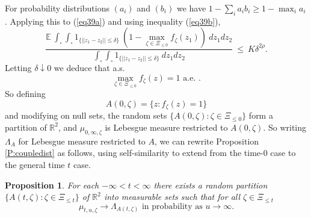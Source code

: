 \documentclass[12pt]{article}
\newtheorem{Proposition}[Lemma]{Proposition}
\newcommand{\Reals}{{\mathbb{R}}}
\newcommand{\Ex}{{\mathbb E}}
\newcommand{\indic}{1}
\begin{document}
 For probability distributions $(a_i)$ and $(b_i)$ we have
 $1 - \sum_i a_ib_i \ge  1 - \max_i a_i$.
 Applying this to (\ref{eq39a}) and using inequality (\ref{eq39b}), 
 \[ \frac
 { \Ex \  \int_\square \int_\square  \indic_{ \{ ||z_1-z_2|| \le \delta\} } \     \left(1 - \max_{\zeta \in \Xi_{\le 0}   } f_\zeta(z_1)    \right)              \ dz_1 dz_2 }
 {  \int_\square \int_\square  \indic_{ \{ ||z_1-z_2|| \le \delta\} }  \ dz_1 dz_2 }
 \ \le \ K \delta^{2 \rho} . 
 \]
 Letting $\delta \downarrow 0$ we deduce that a.s.
 \[ \max_{\zeta \in \Xi_{\le 0}}   f_\zeta(z)   = 1 \mbox{ a.e. }. \]
 So defining
 \[ A(0, \zeta) = \{z: f_\zeta(z) = 1 \} \]
 and modifying on null sets, the random sets 
 $ \{ A(0,\zeta) : \zeta \in \Xi_{\le 0}   \} $
 form a partition of $\Reals^2$, and 
$\mu_{0,\infty,\zeta}$ is Lebesgue measure restricted to $A(0,\zeta)$.
So writing $\Lambda_A$ for Lebesgue measure restricted to $A$, we can rewrite Proposition \ref{P:coupledist} as follows, 
using self-similarity to extend from the time-$0$ case to the general time $t$ case.
\begin{Proposition}
\label{P:partition}
For each $- \infty < t < \infty$ there exists
a random partition 
$\{ A(t,\zeta) : \zeta \in \Xi_{\le t} \}$ of $\Reals^2$ into measurable sets such that 
for all $\zeta \in \Xi_{\le t}$
\[  \mu_{t,u,\zeta} \to \Lambda_{A(t,\zeta)} \mbox{ in probability as } u \to \infty.
\]
\end{Proposition}
\end{document}
